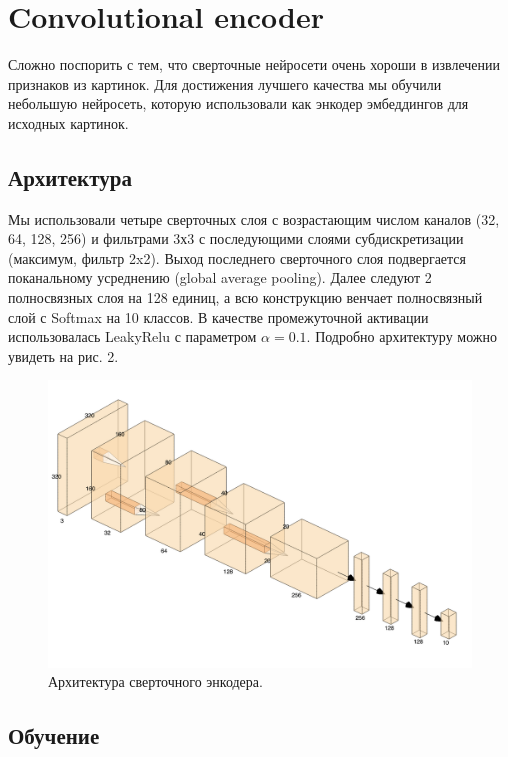 \documentclass{article}
\begin{document}
\section{Convolutional encoder}

Сложно поспорить с тем, что сверточные нейросети очень хороши в извлечении признаков из картинок. Для достижения лучшего качества мы обучили небольшую нейросеть, которую использовали как энкодер эмбеддингов для исходных картинок.

\subsection{Архитектура}

Мы использовали четыре сверточных слоя с возрастающим числом каналов (32, 64, 128, 256) и фильтрами 3х3 с последующими слоями субдискретизации (максимум, фильтр 2x2). Выход последнего сверточного слоя подвергается поканальному усреднению (global average pooling). Далее следуют 2 полносвязных слоя на 128 единиц, а всю конструкцию венчает полносвязный слой с Softmax на 10 классов. В качестве промежуточной активации использовалась LeakyRelu с параметром $\alpha = 0.1$. Подробно архитектуру можно увидеть на рис. 2.

\begin{figure}[H]
    \centering
    \includegraphics[width=14cm]{images/archirecture.png}
    \caption{Архитектура сверточного энкодера.}
    \label{fig:my_label}
\end{figure}{}

\subsection{Обучение}
\end{document}
